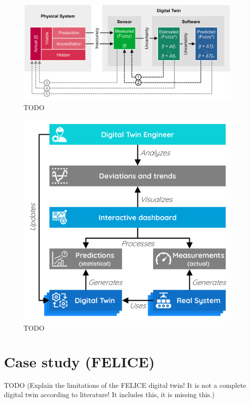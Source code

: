 \documentclass[9pt,conference]{IEEEtran}
\begin{document}
    \begin{figure}[htbp]
        \includegraphics[width=\columnwidth]{Digital Twin Deviation.png}
        \caption{TODO}
        \label{todo-2}
    \end{figure}

    \begin{figure}[htbp]
        \includegraphics[width=\columnwidth]{Continuous Quality Control.png}
        \caption{TODO}
        \label{todo-3}
    \end{figure}

    \section{Case study (FELICE)}
    \label{section:case}
    TODO (Explain the limitations of the FELICE digital twin! It is not a complete digital twin according to literature! It includes this, it is missing this.)
\end{document}
